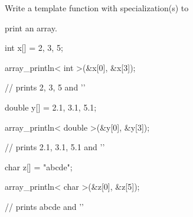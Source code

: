 Write a template function with specialization(s) to

print an array.



\begin{consolethree}[escapeinside=||]

int x[] = {2, 3, 5};

array_println< int >(&x[0], &x[3]);

// prints {2, 3, 5} and '\n'



double y[] = {2.1, 3.1, 5.1};

array_println< double >(&y[0], &y[3]);

// prints {2.1, 3.1, 5.1} and '\n'



char z[] = "abcde";

array_println< char >(&z[0], &z[5]);

// prints abcde and '\n'

\end{consolethree}

